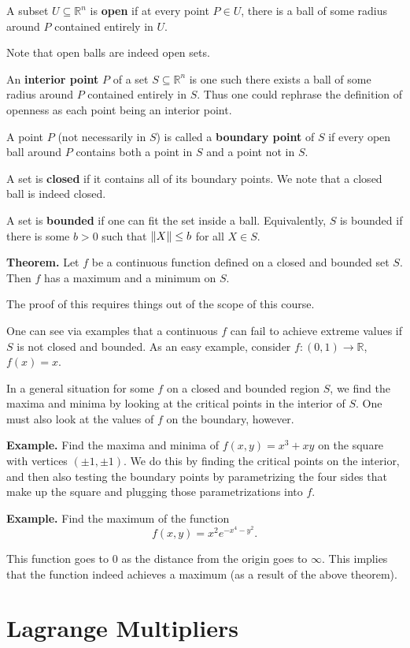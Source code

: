 \documentclass{article}
\begin{document}
A subset $U \subseteq \mathbb{R}^n$ is \textbf{open} if at every point $P \in U$, there is a ball of some radius around $P$
contained entirely in $U$.

Note that open balls are indeed open sets.

An \textbf{interior point} $P$ of a set $S \subseteq \mathbb{R}^n$ is one such there exists a ball
of some radius around $P$ contained entirely in $S$. Thus one could rephrase the definition of openness
as each point being an interior point.

A point $P$ (not necessarily in $S$) is called a \textbf{boundary point} of $S$ if every open ball around 
$P$ contains both a point in $S$ and a point not in $S$.

A set is \textbf{closed} if it contains all of its boundary points. We note
that a closed ball is indeed closed.

A set is \textbf{bounded} if one can fit the set inside a ball. Equivalently, $S$ is bounded
if there is some $b>0$ such that $\norm{X} \leq b$ for all $X\in S$.

\textbf{Theorem.} Let $f$ be a continuous function defined on a closed and bounded set $S$. Then $f$
has a maximum and a minimum on $S$. 

The proof of this requires things out of the scope of this course.

One can see via examples that a continuous $f$ can fail to achieve extreme values if $S$ is not closed and bounded.
As an easy example, consider $f:(0,1)\to \mathbb{R}$, $f(x)=x$. 

In a general situation for some $f$ on a closed and bounded region $S$, we find the maxima and minima
by looking at the critical points in the interior of $S$. One must also look at the values of $f$ on the boundary,
however.

\textbf{Example.} Find the maxima and minima of $f(x,y) = x^3 + xy$ on the square with vertices
$(\pm 1, \pm 1)$. We do this by finding the critical points on the interior, and then also testing
the boundary points by parametrizing the four sides that make up the square and plugging those
parametrizations into $f$.

\textbf{Example.} Find the maximum of the function
\[f(x,y) = x^2 e^{-x^4-y^2}.\]

This function goes to $0$ as the distance from the origin goes
to $\infty$. This implies that the function indeed achieves a
maximum (as a result of the above theorem).

\section*{Lagrange Multipliers}
\end{document}
